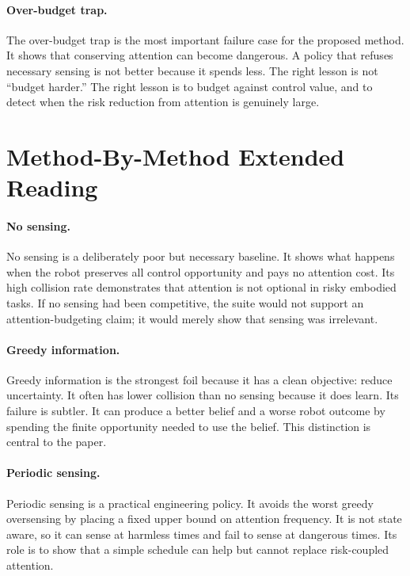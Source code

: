 \documentclass{article}
\begin{document}
\paragraph{Over-budget trap.}
The over-budget trap is the most important failure case for the proposed
method. It shows that conserving attention can become dangerous. A policy that
refuses necessary sensing is not better because it spends less. The right
lesson is not ``budget harder.'' The right lesson is to budget against control
value, and to detect when the risk reduction from attention is genuinely
large.

\section{Method-By-Method Extended Reading}

\paragraph{No sensing.}
No sensing is a deliberately poor but necessary baseline. It shows what
happens when the robot preserves all control opportunity and pays no attention
cost. Its high collision rate demonstrates that attention is not optional in
risky embodied tasks. If no sensing had been competitive, the suite would not
support an attention-budgeting claim; it would merely show that sensing was
irrelevant.

\paragraph{Greedy information.}
Greedy information is the strongest foil because it has a clean objective:
reduce uncertainty. It often has lower collision than no sensing because it
does learn. Its failure is subtler. It can produce a better belief and a worse
robot outcome by spending the finite opportunity needed to use the belief. This
distinction is central to the paper.

\paragraph{Periodic sensing.}
Periodic sensing is a practical engineering policy. It avoids the worst greedy
oversensing by placing a fixed upper bound on attention frequency. It is not
state aware, so it can sense at harmless times and fail to sense at dangerous
times. Its role is to show that a simple schedule can help but cannot replace
risk-coupled attention.
\end{document}
